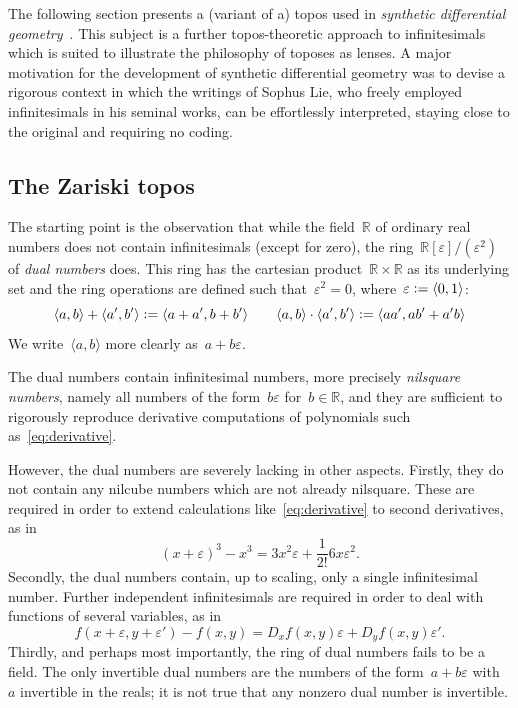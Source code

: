 \documentclass[oneside,reqno]{amsart}
\theoremstyle{definition}
\theoremstyle{plain}
\theoremstyle{remark}
\newcommand{\RR}{\mathbb{R}}
\newcommand{\defeq}{\vcentcolon=}
\renewcommand{\_}{\mathpunct{.}\,}
\newcommand{\?}{\,{:}\,}
\begin{document}
The following section presents a (variant of a) topos used in \emph{synthetic differential
geometry}~\cite{kock:sdg,kock:new-methods}. This subject is a further topos-theoretic
approach to infinitesimals which is suited to illustrate the philosophy of toposes
as lenses. A major motivation for the development of synthetic differential
geometry was to devise a rigorous context in which the
writings of Sophus Lie, who freely employed infinitesimals in his seminal
works, can be effortlessly interpreted, staying close to the
original and requiring no coding.


\subsection{The Zariski topos}
\label{sect:the-zariski-topos}
The starting point is the observation that
while the field~$\RR$ of ordinary real numbers does not contain infinitesimals
(except for zero), the ring~$\RR[\varepsilon]/(\varepsilon^2)$ of \emph{dual
numbers} does. This ring has the cartesian product~$\RR \times \RR$ as its
underlying set and the ring operations are defined such
that~$\varepsilon^2 = 0$, where~$\varepsilon \defeq \langle 0,1 \rangle$:
\[
  \langle a,b \rangle + \langle a',b' \rangle \defeq
  \langle a+a', b+b' \rangle \qquad
  \langle a,b \rangle \cdot \langle a',b' \rangle \defeq
  \langle aa', ab'+a'b \rangle
\]
We write~$\langle a,b \rangle$ more clearly
as~$a+b\varepsilon$.

The dual numbers contain infinitesimal numbers, more precisely \emph{nilsquare
numbers}, namely all numbers of the form~$b \varepsilon$ for~$b \in \RR$, and
they are sufficient to rigorously reproduce derivative computations of
polynomials such as~\eqref{eq:derivative}.

However, the dual numbers are severely lacking in other aspects. Firstly, they
do not contain any nilcube numbers which are not already nilsquare. These are
required in order to extend calculations like~\eqref{eq:derivative} to second
derivatives, as in
\[ (x+\varepsilon)^3 - x^3 = 3x^2\varepsilon + \frac{1}{2!} 6x
\varepsilon^2. \]
Secondly, the dual numbers contain, up to scaling, only a single infinitesimal
number. Further independent infinitesimals are required in order to deal with
functions of several variables, as in
\[ f(x+\varepsilon,y+\varepsilon') - f(x,y) = D_xf(x,y)\varepsilon +
D_yf(x,y)\varepsilon'. \]
Thirdly, and perhaps most importantly, the ring of dual numbers fails to be a
field. The only invertible dual numbers are the numbers of the form~$a +
b\varepsilon$ with~$a$ invertible in the reals; it is not true that any nonzero
dual number is invertible.
\end{document}
